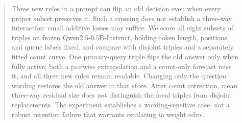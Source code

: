 \begin{abstract}
Three new rules in a prompt can flip an old decision even when every proper subset preserves it.
Such a crossing does not establish a three-way interaction: small additive losses may suffice.
We score all eight subsets of \holdoutN{} triples on frozen Qwen2.5-0.5B-Instruct, holding token length, positions, and queue labels fixed, and compare with disjoint triples and a separately fitted count curve.
One primary-query triple flips the old answer only when fully active; both a pairwise extrapolation and a count-only forecast miss it, and all three new rules remain readable.
Changing only the question wording restores the old answer in that store.
After count correction, mean three-way residual size does not distinguish the focal triples from disjoint replacements.
The experiment establishes a wording-sensitive case, not a robust retention failure that warrants escalating to weight edits.
\end{abstract}
